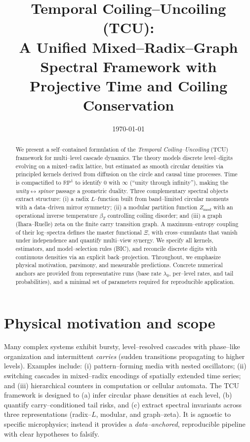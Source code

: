 \documentclass[11pt]{article}
\title{\textbf{Temporal Coiling--Uncoiling (TCU):\\
A Unified Mixed--Radix--Graph Spectral Framework with Projective Time and Coiling Conservation}}
\author{}
\date{\today}
\newcommand{\RP}{\mathbb{R}\mathrm{P}^1}
\begin{document}
\maketitle

\begin{abstract}
We present a self--contained formulation of the \emph{Temporal Coiling--Uncoiling} (TCU) framework for multi--level cascade dynamics.
The theory models discrete level--digits evolving on a mixed--radix lattice, but estimated as smooth circular densities via principled kernels derived from diffusion on the circle and causal time processes.
Time is compactified to $\RP$ to identify $0$ with $\infty$ (``unity through infinity''), making the \emph{unity$\leftrightarrow$spinor} passage a geometric duality.
Three complementary spectral objects extract structure: (i) a radix $L$--function built from band--limited circular moments with a data--driven mirror symmetry; (ii) a modular partition function $Z_{\mathrm{mod}}$ with an operational inverse temperature $\beta_T$ controlling coiling disorder; and (iii) a graph (Ihara--Ruelle) zeta on the finite carry transition graph.
A maximum--entropy coupling of their log--spectra defines the master functional $\Xi$, with cross--cumulants that vanish under independence and quantify multi--view synergy.
We specify all kernels, estimators, and model--selection rules (BIC), and reconcile discrete digits with continuous densities via an explicit back--projection.
Throughout, we emphasize physical motivation, parsimony, and measurable predictions.
Concrete numerical anchors are provided from representative runs (base rate $\lambda_0$, per--level rates, and tail probabilities), and a minimal set of parameters required for reproducible application.
\end{abstract}

\section{Physical motivation and scope}
Many complex systems exhibit bursty, level--resolved cascades with phase--like organization and intermittent \emph{carries} (sudden transitions propagating to higher levels).
Examples include: (i) pattern--forming media with nested oscillators; (ii) switching cascades in mixed--radix encodings of spatially extended time series; and (iii) hierarchical counters in computation or cellular automata.
The TCU framework is designed to (a) infer circular phase densities at each level, (b) quantify carry--conditioned tail risks, and (c) extract spectral invariants across three representations (radix--$L$, modular, and graph--zeta).
It is agnostic to specific microphysics; instead it provides a \emph{data--anchored}, reproducible pipeline with clear hypotheses to falsify.
\end{document}
